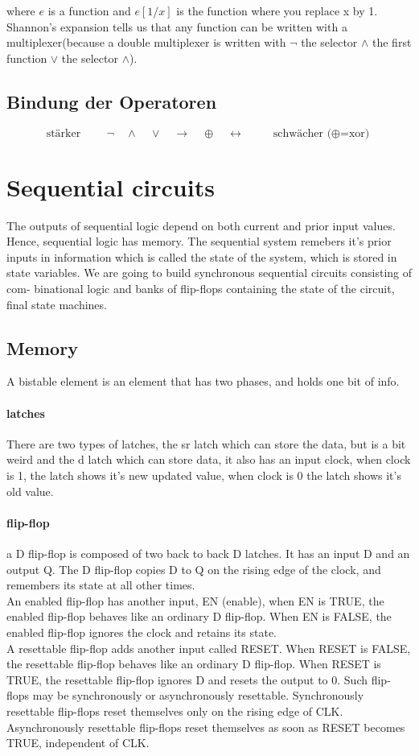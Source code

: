 \begin{multicols}{2}
		where $e$ is a function and $e[1/x]$ is the function where you replace x by 1. Shannon's expansion tells us that any function can be written with a multiplexer(because a double multiplexer is written with $\neg$ the selector $\wedge$ the first function $\vee$ the selector $\wedge$).
	
	\subsection{Bindung der Operatoren}
		\[ \text{ stärker }\qquad \lnot \quad \land \quad \lor \quad \rightarrow \quad \oplus \quad \leftrightarrow \qquad \text{ schwächer ($\oplus$=xor) } \]
	
	\end{multicols}
	\section{Sequential circuits}
	The outputs of sequential logic depend on both current and prior input values. Hence, sequential logic has memory. The sequential system remebers it's prior inputs in information which is called the state of the system, which is stored in state variables. We are going to build synchronous sequential circuits consisting of com- binational logic and banks of flip-flops containing the state of the circuit, final state machines.\\
	\subsection{Memory}
	A bistable element is an element that has two phases, and holds one bit of info.
	\paragraph{latches} There are two types of latches, the sr latch which can store the data, but is a bit weird and the d latch which can store data, it also has an input clock, when clock is 1, the latch shows it's new updated value, when clock is 0 the latch shows it's old value.
	\paragraph{flip-flop} a D flip-flop is composed of two back to back D latches. It has an input D and an output Q. The D flip-flop copies D to Q on the rising edge of the clock, and remembers its state at all other times.\\ An enabled flip-flop has another input, EN (enable), when EN is TRUE, the enabled flip-flop behaves like an ordinary D flip-flop. When EN is FALSE, the enabled flip-flop ignores the clock and retains its state.\\A resettable flip-flop adds another input called RESET. When RESET is FALSE, the resettable flip-flop behaves like an ordinary D flip-flop. When RESET is TRUE, the resettable flip-flop ignores D and resets the output to 0. Such flip-flops may be synchronously or asynchronously resettable. Synchronously resettable flip-flops reset themselves only on the rising edge of CLK. Asynchronously resettable flip-flops reset themselves as soon as RESET becomes TRUE, independent of CLK.
